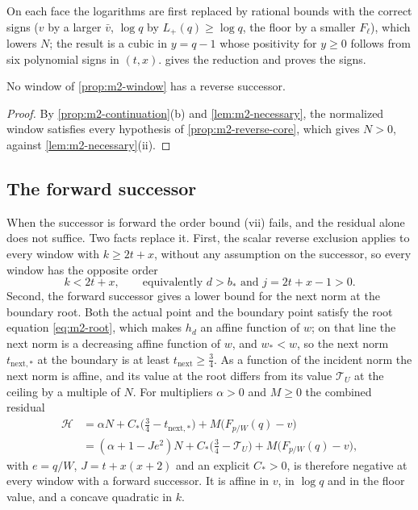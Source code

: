 On each face the logarithms are first replaced by rational bounds with the correct signs ($v$ by a
larger $\bar v$, $\log q$ by $L_+(q)\ge\log q$, the floor by a smaller $F_\ell$), which lowers $N$; the
result is a cubic in $y=q-1$ whose positivity for $y\ge0$ follows from six polynomial signs in
$(t,x)$.  gives the reduction and proves the signs.

\begin{theorem}\label{thm:m2-reverse}
No window of \cref{prop:m2-window} has a reverse successor.
\end{theorem}

\begin{proof}
By \cref{prop:m2-continuation}(b) and \cref{lem:m2-necessary}, the normalized window satisfies every
hypothesis of \cref{prop:m2-reverse-core}, which gives $N>0$, against \cref{lem:m2-necessary}(ii).
\end{proof}

\subsection{The forward successor}\label{sec:m2-forward}

When the successor is forward the order bound (vii) fails, and the residual alone does not suffice.
Two facts replace it. First, the scalar reverse exclusion applies to every window with $k\ge2t+x$,
without any assumption on the successor, so every window has the opposite order
\begin{equation}\label{eq:m2-order}
k<2t+x,\qquad\text{equivalently } d>b_*\text{ and } j=2t+x-1>0.
\end{equation}
Second, the forward successor gives a lower bound for the next norm at the
boundary root. Both the actual point and the boundary point satisfy the root equation
\eqref{eq:m2-root}, which makes $h_d$ an affine function of $w$; on that line the next norm is a
decreasing affine function of $w$, and $w_*<w$, so the next norm $t_{\mathrm{next},*}$ at the
boundary is at least $t_{\mathrm{next}}\ge\frac34$. As a function of the
incident norm the next norm is affine, and its value at the root differs from its value
$\mathcal T_U$ at the ceiling by a multiple of $N$. For multipliers $\alpha>0$ and $M\ge0$ the
combined residual
\begin{equation}\label{eq:m2-comb}
\begin{aligned}
\mathcal H&=\alpha N+C_*\bigl(\tfrac34-t_{\mathrm{next},*}\bigr)+M\bigl(F_{p/W}(q)-v\bigr)\\
&=(\alpha+1-Je^2)N+C_*\bigl(\tfrac34-\mathcal T_U\bigr)+M\bigl(F_{p/W}(q)-v\bigr),
\end{aligned}
\end{equation}
with $e=q/W$, $J=t+x(x+2)$ and an explicit $C_*>0$, is therefore negative at every window with a
forward successor. It is affine in $v$, in $\log q$ and in the floor value,
and a concave quadratic in $k$.

